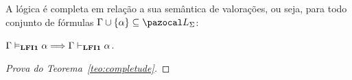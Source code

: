     \begin{teorema}[Completude]\label{teo:completude}
        A lógica {\normalfont\lfium{}} é completa em relação a sua semântica de valorações, ou seja, para todo conjunto de fórmulas $\Gamma \cup \{\alpha\} \subseteq \ling{}$:

        \centering
        {\normalfont{} $\Gamma \vDash_{{\normalfont\textbf{LFI1}}{}} \alpha \Longrightarrow \Gamma \vdash_{{\normalfont\textbf{LFI1}}{}} \alpha$.}
    \end{teorema}

    \begin{proof}[Prova do Teorema~\ref{teo:completude}]
         

    \end{proof}

